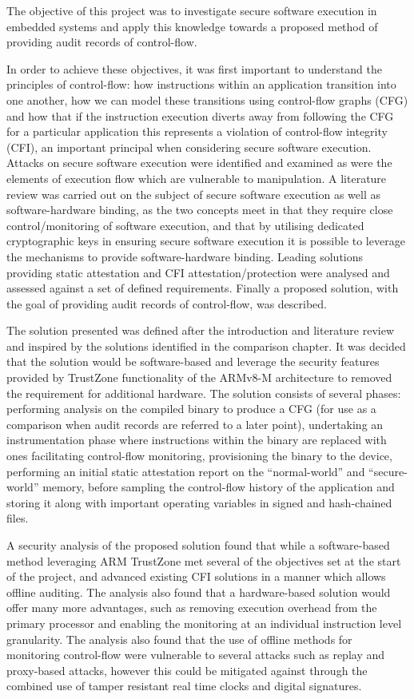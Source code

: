 The objective of this project was to investigate secure software execution in embedded systems and apply this knowledge towards a proposed method of providing audit records of control-flow.

In order to achieve these objectives, it was first important to understand the principles of control-flow: how instructions within an application transition into one another, how we can model these transitions using control-flow graphs (CFG) and how that if the instruction execution diverts away from following the CFG for a particular application this represents a violation of control-flow integrity (CFI), an important principal when considering secure software execution. Attacks on secure software execution were identified and examined as were the elements of execution flow which are vulnerable to manipulation. A literature review was carried out on the subject of secure software execution as well as software-hardware binding, as the two concepts meet in that they require close control\slash monitoring of software execution, and that by utilising dedicated cryptographic keys in ensuring secure software execution it is possible to leverage the mechanisms to provide software-hardware binding. Leading solutions providing static attestation and CFI attestation\slash protection were analysed and assessed against a set of defined requirements. Finally a proposed solution, with the goal of providing audit records of control-flow, was described.

The solution presented was defined after the introduction and literature review and inspired by the solutions identified in the comparison chapter. It was decided that the solution would be software-based and leverage the security features provided by TrustZone functionality of the ARMv8-M architecture to removed the requirement for additional hardware. The solution consists of several phases: performing analysis on the compiled binary to produce a CFG (for use as a comparison when audit records are referred to a later point), undertaking an instrumentation phase where instructions within the binary are replaced with ones facilitating control-flow monitoring, provisioning the binary to the device, performing an initial static attestation report on the ``normal-world'' and ``secure-world'' memory, before sampling the control-flow history of the application and storing it along with important operating variables in signed and hash-chained files.

A security analysis of the proposed solution found that while a software-based method leveraging ARM TrustZone met several of the objectives set at the start of the project, and advanced existing CFI solutions in a manner which allows offline auditing. The analysis also found that a hardware-based solution would offer many more advantages, such as removing execution overhead from the primary processor and enabling the monitoring at an individual instruction level granularity. The analysis also found that the use of offline methods for monitoring control-flow were vulnerable to several attacks such as replay and proxy-based attacks, however this could be mitigated against through the combined use of tamper resistant real time clocks and digital signatures.

